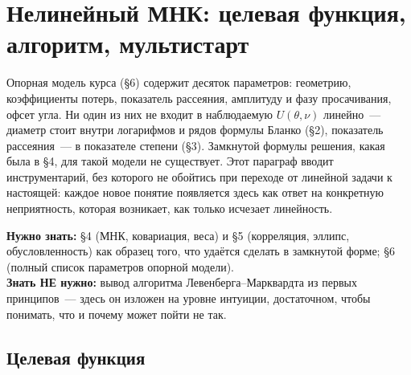 %
%
\section{Нелинейный МНК: целевая функция, алгоритм, мультистарт}
\label{sec:nonlinear-fit}

Опорная модель курса (§6) содержит десяток параметров: геометрию, коэффициенты потерь, показатель
рассеяния, амплитуду и фазу просачивания, офсет угла. Ни один из них не входит в наблюдаемую
$U(\theta,\nu)$ линейно~--- диаметр стоит внутри логарифмов и рядов формулы Бланко (§2), показатель
рассеяния~--- в показателе степени (§3). Замкнутой формулы решения, какая была в §4, для такой
модели не существует. Этот параграф вводит инструментарий, без которого не обойтись при переходе
от линейной задачи к настоящей: каждое новое понятие появляется здесь как ответ на конкретную
неприятность, которая возникает, как только исчезает линейность.

\begin{tcolorbox}[enhanced,colback=cPanel,colframe=cGrid,boxrule=0.8pt,arc=2pt,
                  title={\bfseries\color{cAccent} Пререквизиты},coltitle=cAccent,
                  attach boxed title to top left={xshift=6pt,yshift=-2pt},
                  boxed title style={colback=cPanel,boxrule=0pt,arc=0pt},top=10pt]
\textbf{Нужно знать:} §4 (МНК, ковариация, веса) и §5 (корреляция, эллипс, обусловленность) как
образец того, что удаётся сделать в замкнутой форме; §6 (полный список параметров опорной
модели).\\[0.3em]
\textbf{Знать НЕ нужно:} вывод алгоритма Левенберга--Марквардта из первых принципов~--- здесь он
изложен на уровне интуиции, достаточном, чтобы понимать, что и почему может пойти не так.
\end{tcolorbox}

\subsection{Целевая функция}
\label{subsec:objective}

